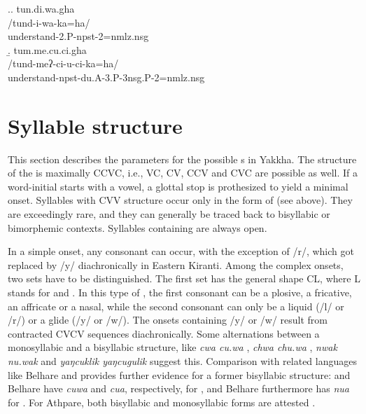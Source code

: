 \ex.\a. \glll tun.di.wa.gha\\
/tund-i-wa-ka=ha/\\
understand{\sc [3A]-2.P-npst-2=nmlz.nsg}\\
\b. \glll tum.me.cu.ci.gha\\
/tund-meʔ-ci-u-ci-ka=ha/\\
understand{\sc -npst-du.A-3.P-3nsg.P-2=nmlz.nsg}\\



\section{Syllable structure}\label{syllable}

This section describes the parameters for the possible s in Yakkha. The structure of the  is maximally 	CCVC, i.e., VC, CV,  CCV and CVC are possible as well. If a word-initial  starts with a vowel, a glottal stop is prothesized to yield a minimal onset. Syllables with CVV structure occur only in the form of  (see  above). They are exceedingly rare, and they can generally be traced back to bisyllabic or bimorphemic contexts. Syllables containing  are always open. 

In a simple onset, any consonant can occur, with the exception of  /r/, which got replaced by /y/ diachronically in Eastern Kiranti. Among the complex onsets, two sets have to be distinguished. The first set has the general shape CL, where L stands for   and . In this type of , the first consonant can be a plosive, a fricative, an affricate or a nasal, while the second consonant can only be a liquid (/l/ or /r/) or a glide (/y/ or /w/). The onsets containing /y/ or /w/ result from contracted CVCV sequences diachronically. Some alternations between a monosyllabic and a bisyllabic structure, like \emph{cwa \ti cu.wa} , \emph{chwa \ti chu.wa} , \emph{nwak \ti nu.wak}  and \emph{yaŋcuklik \ti yaŋcugulik}  suggest this. Comparison with related languages like Belhare and  provides further evidence for a former bisyllabic structure:  and Belhare have \emph{cuwa} and \emph{cua}, respectively, for , and Belhare furthermore has \emph{nua} for  \citep{Bickel1997Dictionary, Raietal2011_Chintangdict}. For Athpare, both bisyllabic and monosyllabic forms are attested \citep{Ebert1997A-grammar}.

